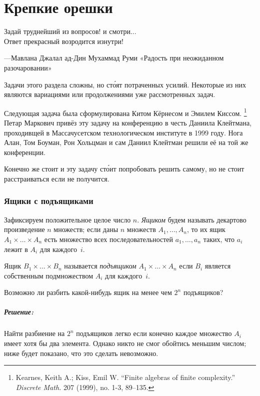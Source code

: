 \chapter*{Крепкие орешки}

\epigraph{Задай  труднейший  из  вопросов!  и  смотри...\\
Ответ  прекрасный  возродится  изнутри!}{---Мавлана Джалал ад-Дин Мухаммад Руми «Радость   при   неожиданном разочаровании»
}

Задачи этого раздела сложны, но ст\'{о}ят потраченных усилий.
Некоторые из них являются вариациями или продолжениями уже рассмотренных задач.

\medskip

Следующая задача была сформулирована
Китом Кёрнесом %
и Эмилем Киссом.%
\footnote{Kearnes, Keith A.; Kiss, Emil W. ``Finite algebras of finite complexity.'' \emph{Discrete Math.} 207 (1999), no. 1-3, 89–135.}
Петар Маркович привёз эту задачу на конференцию в честь Даниила Клейтмана, проходивщей в Массачусетском технологическом институте в 1999 году.
Нога Алан, Том Боуман, Рон Хольцман и сам Даниил Клейтман решили её на той же конференции.

Конечно же стоит и эту задачу ст\'{о}ит попробовать решить самому, но не стоит расстраиваться если не получится.

\subsection*{Ящики с подъящиками}

Зафиксируем положительное целое число $n$.
\emph{Ящиком} будем называть декартово произведение $n$ множеств;
если даны $n$ множеств $A_1,\dots,A_n$, то их ящик $A_1{\times}\dots{\times}A_n$ есть множество всех последовательностей $a_1,\dots,a_n$ таких,
что $a_i$ лежит в $A_i$ для каждого~$i$.

Ящик $B_1{\times}\dots{\times}B_n$ называется \emph{подъящиком} $A_1{\times}\dots{\times}A_n$ если $B_i$ является собственным подмножеством $A_i$ для каждого~$i$. %

Возможно ли разбить какой-нибудь ящик на менее чем $2^n$ подъящиков?

\paragraph{Решение:} Найти разбиение на $2^n$ подъящиков легко если конечно каждое множество $A_i$ имеет хотя бы два элемента.
Однако никто не смог обойтись меньшим числом; ниже будет показано, что это сделать невозможно.

